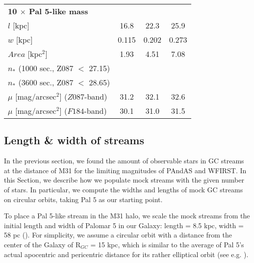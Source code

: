 \documentclass[twocolumn]{aastex62}
\begin{document}
\begin{table*}
\begin{tabular}{lccc}
\hline
{\bf 10 $\times$ Pal 5-like mass} & &&\\ 
$l$ [kpc] &16.8 & 22.3 & 25.9 \\
$w$ [kpc]& 0.115 & 0.202 & 0.273  \\
$Area$ [kpc$^2$] &  1.93& 4.51   & 7.08  \\
$n_*$ (1000 sec., Z087 $<$ 27.15) & & \\
$n_*$ (3600 sec., Z087 $<$ 28.65) & & \\
$\mu$ [mag/arcsec$^2$] ($Z087$-band) &31.2 &32.1  &32.6  \\
$\mu$ [mag/arcsec$^2$] ($F184$-band) & 30.1& 31.0& 31.5 \\


\hline 
\end{tabular}
\end{table*}



\subsection{Length \& width of streams}
\label{sec:length}
In the previous section, we found the amount of observable stars in GC streams at the distance of M31 for the limiting magnitudes of PAndAS and WFIRST. In this Section, we describe how we populate mock streams with the given number of stars. In particular, we compute the widths and lengths of mock GC streams on circular orbits, taking Pal 5 as our starting point. 

To place a Pal 5-like stream in the M31 halo, %
we scale the mock streams from the initial length and width of Palomar 5 in our Galaxy: length = 8.5 kpc, width = 58 pc (\citealt{ibata16}). For simplicity, we assume a circular orbit with a distance from the center of the Galaxy of R$_{GC}$ = 15 kpc, which is similar to the average of Pal 5's actual apocentric and pericentric distance for its rather elliptical orbit (see e.g. \citealt{erkal17}). 
\end{document}
